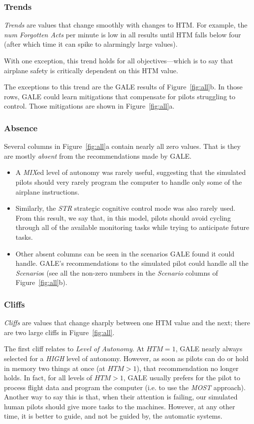 \documentclass[journal]{IEEEtran}
\newcommand{\bi}{\begin{itemize}}
\newcommand{\ei}{\end{itemize}}
\newcommand{\fig}[1]{Figure~\ref{fig:#1}}
\newcommand{\ADD}[1]{#1}
\begin{document}
\subsubsection{Trends}

{\em Trends} are  values that change  smoothly with changes to HTM. For example, the  {\em num Forgotten Acts} per minute is low in all results until HTM falls below four (after which time it can spike to alarmingly large values). 

With one exception, this trend holds for all objectives---which is to say that airplane safety is critically dependent on this HTM value.

The exceptions to this trend are the GALE results of \fig{all}b.  
In those rows, GALE could learn mitigations that compensate for pilots struggling to control. 
Those mitigations are shown in \fig{all}a. 
 

\subsubsection{Absence}

Several columns in \fig{all}a contain nearly all zero values. That is they are mostly {\em absent} from the recommendations made by GALE.

\bi
\item
A {\em MIX}ed level of autonomy was rarely useful, suggesting that the simulated pilots should very rarely program the computer to handle only some of the airplane instructions.
\item
Similarly, the {\em STR} strategic cognitive control mode was also rarely used.
From this result, we say that, in this model, pilots should avoid cycling through all of the available monitoring tasks while trying to anticipate future tasks.
\item Other absent columns can be seen in the scenarios GALE found it could handle. 
GALE's recommendations to the simulated pilot could handle all the {\em Scenario}s (see all the non-zero numbers in the {\em Scenario} columns of \fig{all}b).
\ei


\subsubsection{Cliffs}

{\em Cliffs} are values that change sharply between one HTM value and the next; there are two large cliffs in \fig{all}.

The first cliff relates to {\em Level of Autonomy}. 
At $\mathit{HTM}=1$, GALE nearly always selected for a {\em HIGH} level of autonomy. 
However, as soon as pilots can do or hold in memory two things at once (at $\mathit{HTM}>1$), that recommendation no longer holds.  
In fact, for all levels of $\mathit{HTM}>1$, GALE usually prefers for the pilot to process flight data and program the computer (i.e. to use the {\em MOST} approach).
\ADD{Another way to say this is that, when their attention is failing, our simulated human pilots should give more tasks to the machines.}
However, at any other time, it is better to guide, and not be guided by, the automatic systems.
\end{document}
